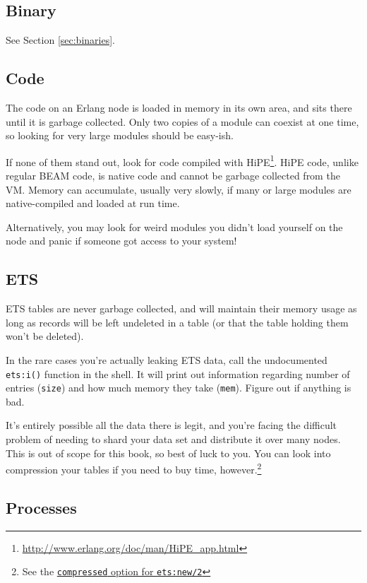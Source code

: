 \documentclass[11pt, oneside]{book}   	%
\newcommand{\function}[1]{\Verb`#1`}
\newcommand{\expression}[1]{\Verb`#1`}
\begin{document}
\subsection{Binary}

See Section \ref{sec:binaries}.

\subsection{Code}

The code on an Erlang node is loaded in memory in its own area, and sits there until it is garbage collected. Only two copies of a module can coexist at one time, so looking for very large modules should be easy-ish.

If none of them stand out, look for code compiled with HiPE\footnote{\href{http://www.erlang.org/doc/man/HiPE\_app.html}{http://www.erlang.org/doc/man/HiPE\_app.html}}. HiPE code, unlike regular BEAM code, is native code and cannot be garbage collected from the VM. Memory can accumulate, usually very slowly, if many or large modules are native-compiled and loaded at run time.

Alternatively, you may look for weird modules you didn't load yourself on the node and panic if someone got access to your system!

\subsection{ETS}

ETS tables are never garbage collected, and will maintain their memory usage as long as records will be left undeleted in a table (or that the table holding them won't be deleted).

In the rare cases you're actually leaking ETS data, call the undocumented \function{ets:i()} function in the shell. It will print out information regarding number of entries (\expression{size}) and how much memory they take (\expression{mem}). Figure out if anything is bad.

It's entirely possible all the data there is legit, and you're facing the difficult problem of needing to shard your data set and distribute it over many nodes. This is out of scope for this book, so best of luck to you. You can look into compression your tables if you need to buy time, however.\footnote{See the \href{http://www.erlang.org/doc/man/ets.html\#new-2}{\expression{compressed} option for \function{ets:new/2}}}

\subsection{Processes}
\end{document}
